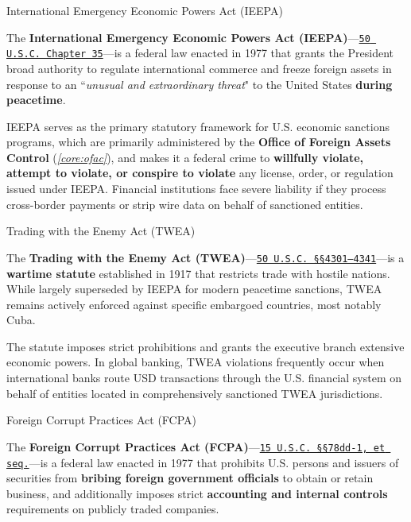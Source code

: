\documentclass[10pt]{article}
\begin{document}
    \begin{core}[label=core:ieepa]{International Emergency Economic Powers Act (IEEPA)}

      The \textbf{International Emergency Economic Powers Act (IEEPA)}---\href{https://www.law.cornell.edu/uscode/text/50/chapter-35}{\texttt{50 U.S.C. Chapter 35}}---is a federal law enacted in 1977 that grants the President broad authority to regulate international commerce and freeze foreign assets in response to an ``\textit{unusual and extraordinary threat}" to the United States \textbf{during peacetime}.
      
      IEEPA serves as the primary statutory framework for U.S. economic sanctions programs, which are primarily administered by the \textbf{Office of Foreign Assets Control} (\textit{\autoref{core:ofac}}), and makes it a federal crime to \textbf{willfully violate, attempt to violate, or conspire to violate} any license, order, or regulation issued under IEEPA. Financial institutions face severe liability if they process cross-border payments or strip wire data on behalf of sanctioned entities.

    \end{core}

    \begin{core}[label=core:twea]{Trading with the Enemy Act (TWEA)}

      The \textbf{Trading with the Enemy Act (TWEA)}---\href{https://www.law.cornell.edu/uscode/text/50/4301}{\texttt{50 U.S.C. \S\S 4301–4341}}---is a \textbf{wartime statute} established in 1917 that restricts trade with hostile nations. While largely superseded by IEEPA for modern peacetime sanctions, TWEA remains actively enforced against specific embargoed countries, most notably Cuba.

      The statute imposes strict prohibitions and grants the executive branch extensive economic powers. In global banking, TWEA violations frequently occur when international banks route USD transactions through the U.S. financial system on behalf of entities located in comprehensively sanctioned TWEA jurisdictions.

    \end{core}

    \begin{core}[label=core:fcpa]{Foreign Corrupt Practices Act (FCPA)}

      The \textbf{Foreign Corrupt Practices Act (FCPA)}---\href{https://www.law.cornell.edu/uscode/text/15/78dd-1}{\texttt{15 U.S.C. \S\S 78dd-1, et seq.}}---is a federal law enacted in 1977 that prohibits U.S. persons and issuers of securities from \textbf{bribing foreign government officials} to obtain or retain business, and additionally imposes strict \textbf{accounting and internal controls} requirements on publicly traded companies.

    \end{core}
\end{document}
